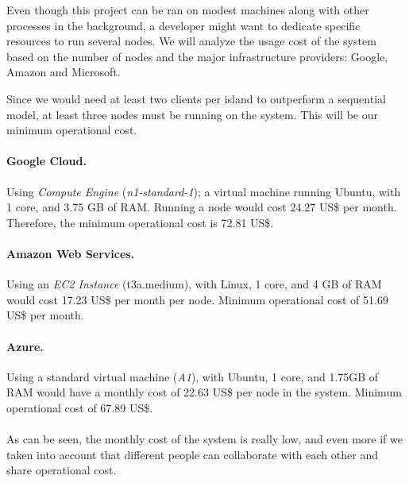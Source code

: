 Even though this project can be ran on modest machines along with other processes in the background, a developer might want to dedicate specific resources to run several nodes. We will analyze the usage cost of the system based on the number of nodes and the major infrastructure providers: Google, Amazon and Microsoft.

Since we would need at least two clients per island to outperform a sequential model, at least three nodes must be running on the system. This will be our minimum operational cost.

\paragraph*{Google Cloud.} Using \textit{Compute Engine} (\textit{n1-standard-1}); a virtual machine running Ubuntu, with 1 core, and 3.75 GB of RAM. Running a node would cost 24.27 US\$ per month. Therefore, the minimum operational cost is 72.81 US\$. \cite{gcp-calculator}

\paragraph*{Amazon Web Services.} Using an \textit{EC2 Instance} (t3a.medium), with Linux, 1 core, and 4 GB of RAM would cost 17.23 US\$ per month per node. Minimum operational cost of 51.69 US\$ per month. \cite{aws-calculator}

\paragraph*{Azure.} Using a standard virtual machine (\textit{A1}), with Ubuntu, 1 core, and 1.75GB of RAM would have a monthly cost of 22.63 US\$ per node in the system. Minimum operational cost of 67.89 US\$. \cite{azure-calculator}

\paragraph*{}
As can be seen, the monthly cost of the system is really low, and even more if we taken into account that different people can collaborate with each other and share operational cost.